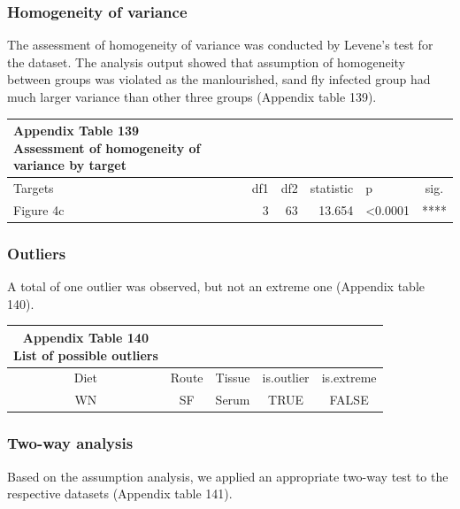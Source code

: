 \documentclass[
  12pt,
  letterpaper,
]{article}
\begin{document}
\subsubsection{Homogeneity of variance}\label{homogeneity-of-variance-4}

The assessment of homogeneity of variance was conducted by Levene's test for the dataset. The analysis output showed that assumption of homogeneity between groups was violated as the manlourished, sand fly infected group had much larger variance than other three groups (Appendix table 139).

\begingroup
\fontsize{12.0pt}{14.4pt}\selectfont
\begin{longtable}{l|rrrlc}
\caption*{
{\large \textbf{Appendix Table 139}} \\ 
{\small \textbf{Assessment of homogeneity of variance by target}}
} \\ 
\toprule
Targets & {df1} & {df2} & {statistic} & {p} & {sig.} \\ 
\midrule\addlinespace[2.5pt]
Figure 4c & 3 & 63 & 13.654 & <0.0001 & **** \\ 
\bottomrule
\end{longtable}
\endgroup

\subsubsection{Outliers}\label{outliers-4}

A total of one outlier was observed, but not an extreme one (Appendix table 140).

\begingroup
\fontsize{12.0pt}{14.4pt}\selectfont
\begin{longtable}{ccccc}
\caption*{
{\large \textbf{Appendix Table 140}} \\ 
{\small \textbf{List of possible outliers}}
} \\ 
\toprule
{Diet} & {Route} & {Tissue} & {is.outlier} & {is.extreme} \\ 
\midrule\addlinespace[2.5pt]
WN & SF & Serum & TRUE & FALSE \\ 
\bottomrule
\end{longtable}
\endgroup

\subsubsection{Two-way analysis}\label{two-way-analysis-1}

Based on the assumption analysis, we applied an appropriate two-way test to the respective datasets (Appendix table 141).
\end{document}
